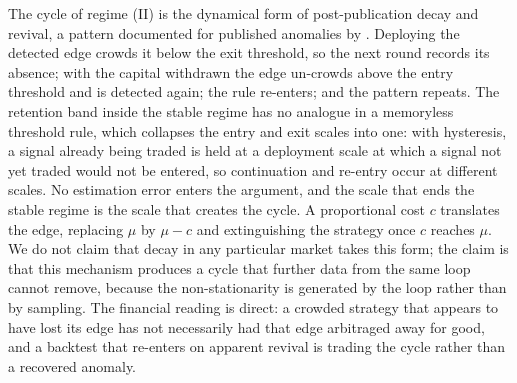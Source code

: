 \documentclass[11pt]{article}
\theoremstyle{plain}
\theoremstyle{definition}
\begin{document}
The cycle of regime (II) is the dynamical form of post-publication decay and revival, a pattern documented for published anomalies by \citet{mclean2016}. Deploying the detected edge crowds it below the exit threshold, so the next round records its absence; with the capital withdrawn the edge un-crowds above the entry threshold and is detected again; the rule re-enters; and the pattern repeats. The retention band inside the stable regime has no analogue in a memoryless threshold rule, which collapses the entry and exit scales into one: with hysteresis, a signal already being traded is held at a deployment scale at which a signal not yet traded would not be entered, so continuation and re-entry occur at different scales. No estimation error enters the argument, and the scale that ends the stable regime is the scale that creates the cycle. A proportional cost $c$ translates the edge, replacing $\mu$ by $\mu-c$ and extinguishing the strategy once $c$ reaches $\mu$. We do not claim that decay in any particular market takes this form; the claim is that this mechanism produces a cycle that further data from the same loop cannot remove, because the non-stationarity is generated by the loop rather than by sampling. The financial reading is direct: a crowded strategy that appears to have lost its edge has not necessarily had that edge arbitraged away for good, and a backtest that re-enters on apparent revival is trading the cycle rather than a recovered anomaly.
\end{document}

